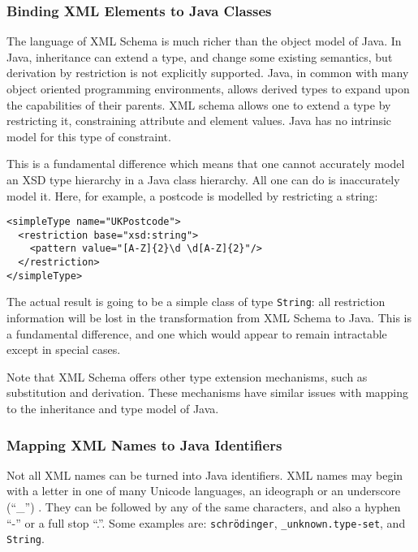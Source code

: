 \subsubsection{Binding XML Elements to Java Classes}
\label{objections:o-x:xml-classes}

The language of XML Schema is much richer than the object model of
Java. In Java, inheritance can extend a type, and change some existing
semantics, but derivation by restriction is not explicitly
supported. Java, in common with many object oriented programming
environments, allows derived types to expand upon the capabilities of
their parents. XML schema allows one to extend a type by restricting
it, constraining attribute and element values. Java has no intrinsic
model for this type of constraint.

This is a fundamental difference which means that one cannot
accurately model an XSD type hierarchy in a Java class hierarchy. All
one can do is inaccurately model it. Here, for example, a postcode is
modelled by restricting a string:


\begin{verbatim}
<simpleType name="UKPostcode">
  <restriction base="xsd:string">
    <pattern value="[A-Z]{2}\d \d[A-Z]{2}"/>
  </restriction>
</simpleType>
\end{verbatim}

The actual result is going to be a simple class of type {\tt String}:
all restriction information will be lost in the transformation from
XML Schema to Java. This is a fundamental difference, and one which
would appear to remain intractable except in special cases.

Note that XML Schema offers other type extension mechanisms, such as
substitution and derivation. These mechanisms have similar issues with mapping
to the inheritance and type model of Java. 

\subsubsection{Mapping XML Names to Java Identifiers}
\label{objections:o-x:names}

Not all XML names can be turned into Java identifiers.  XML names may
begin with a letter in one of many Unicode languages, an ideograph or
an underscore (``\_'') . They can be followed by any of the same
characters, and also a hyphen ``-'' or a full stop ``.''. Some
examples are: {\tt schr\"odinger}, {\tt \_unknown.type-set}, and {\tt
String}.

